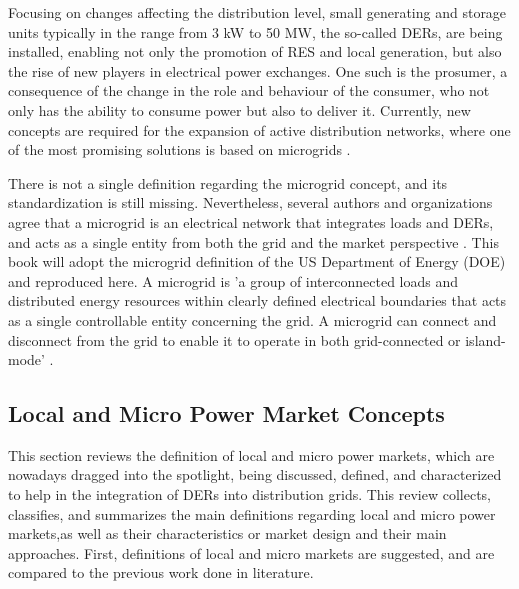 Focusing on changes affecting the distribution level, small generating and storage units typically in the range from 3 kW to 50 MW, the so-called DERs, are being installed, enabling not only the promotion of RES and local generation, but also the rise of new players in electrical power exchanges. One such is the prosumer, a consequence of the change in the role and behaviour of the consumer, who not only has the ability to consume power but also to deliver it. Currently, new concepts are required for the expansion of active distribution networks, where one of the most promising solutions is based on microgrids \cite{series2009microgrids}.

There is not a single definition regarding the microgrid concept, and its standardization is still missing. Nevertheless, several authors and organizations agree that a microgrid is an electrical network that integrates loads and DERs, and acts as a single entity from both the grid and the market perspective \cite{hatziargyriou2007microgrids, ton2012us}. This book will adopt the microgrid definition of the US Department of Energy (DOE) and reproduced here. A microgrid is 'a group of interconnected loads and distributed energy resources within clearly defined
electrical boundaries that acts as a single controllable entity concerning the grid. A microgrid can connect and disconnect from the grid to enable it to operate in both grid-connected or island-mode' \cite{ton2012us}.

\subsection{Local and Micro Power Market Concepts}
This section reviews the definition of local and micro power markets, which are nowadays dragged into the spotlight, being discussed, defined, and characterized to help in the integration of DERs into distribution grids. This review collects, classifies, and summarizes the main definitions regarding local and micro power markets,as well as their characteristics or market design and their main approaches. First, definitions of local and micro markets are suggested, and are compared to the previous work done in literature.

